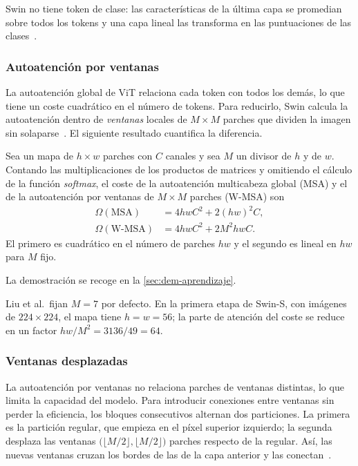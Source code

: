 Swin no tiene token de clase: las características de la última capa se promedian
sobre todos los tokens y una capa lineal las transforma en las puntuaciones de
las clases~\cite[sec.~12.10.3]{prince2023understanding}.

\subsubsection{Autoatención por ventanas}

La autoatención global de ViT relaciona cada token con todos los demás, lo que
tiene un coste cuadrático en el número de tokens. Para reducirlo, Swin calcula la
autoatención dentro de \emph{ventanas} locales de $M\times M$ parches que dividen
la imagen sin solaparse~\cite[sec.~3.2]{liu2021swin}. El siguiente resultado
cuantifica la diferencia.

\begin{proposicion}\label{prop:swin-coste}
Sea un mapa de $h\times w$ parches con $C$ canales y sea $M$ un divisor de $h$ y
de $w$. Contando las multiplicaciones de los productos de matrices y omitiendo el
cálculo de la función \emph{softmax}, el coste de la autoatención multicabeza
global (MSA) y el de la autoatención por ventanas de $M\times M$ parches (W-MSA)
son
\begin{align*}
  \Omega(\mathrm{MSA}) &= 4hwC^2 + 2(hw)^2C,\\
  \Omega(\text{W-MSA}) &= 4hwC^2 + 2M^2hwC.
\end{align*}
El primero es cuadrático en el número de parches $hw$ y el segundo es lineal en
$hw$ para $M$ fijo.
\end{proposicion}

La demostración se recoge en la \cref{sec:dem-aprendizaje}.

Liu et al.\ fijan $M = 7$ por defecto. En la primera etapa de Swin-S, con
imágenes de $224\times224$, el mapa tiene $h = w = 56$; la parte de atención del
coste se reduce en un factor $hw/M^2 = 3136/49 = 64$.

\subsubsection{Ventanas desplazadas}

La autoatención por ventanas no relaciona parches de ventanas distintas, lo que
limita la capacidad del modelo. Para introducir conexiones entre ventanas sin
perder la eficiencia, los bloques consecutivos alternan dos particiones. La
primera es la partición regular, que empieza en el píxel superior izquierdo; la
segunda desplaza las ventanas $\bigl(\lfloor M/2\rfloor, \lfloor M/2\rfloor\bigr)$
parches respecto de la regular. Así, las nuevas ventanas cruzan los bordes de las
de la capa anterior y las conectan~\cite[sec.~3.2]{liu2021swin}.


